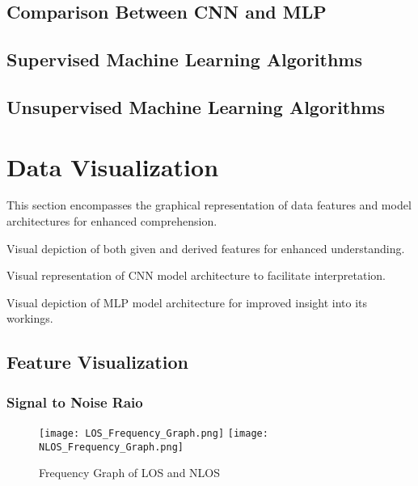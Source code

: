 \documentclass[
	a4paper, %
	11pt, %
]{CSUniSchoolLabReport}
\begin{document}
\subsection{Comparison Between CNN and MLP}\label{cnn_vs_mlp}

\subsection{Supervised Machine Learning Algorithms}\label{sml}

\subsection{Unsupervised Machine Learning Algorithms}\label{uml}


\section{Data Visualization}\label{data_visualisation}

This section encompasses the graphical representation of data features and model architectures for enhanced comprehension.

\begin{description}[style=nextline]
    \item[Feature Visualization:] Visual depiction of both given and derived features for enhanced understanding.
    \item[Convolution Neural Network:] Visual representation of CNN model architecture to facilitate interpretation.
    \item[Multilayer Perceptron:] Visual depiction of MLP model architecture for improved insight into its workings.
\end{description}

\subsection{Feature Visualization}\label{feature_visualization}

\subsubsection{Signal to Noise Raio}\label{snr}

\begin{figure}[H] 
	\centering
	\texttt{[image: LOS\_Frequency\_Graph.png]}
	\texttt{[image: NLOS\_Frequency\_Graph.png]}
	\caption{Frequency Graph of LOS and NLOS}\label{fig:frequency_graph}
\end{figure}
\end{document}
